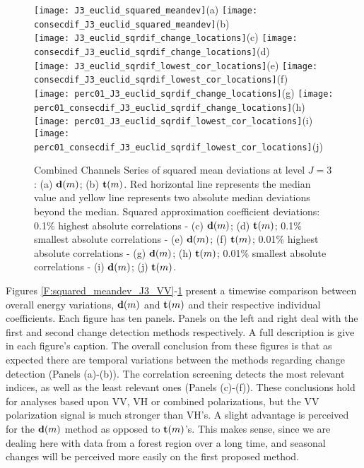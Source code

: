 \documentclass[journal]{IEEEtran}
\newcommand{\vd}{{\textbf d}}
\newcommand{\vt}{{\textbf t}}
\begin{document}
\begin{figure}[htp!]
\texttt{[image: J3\_euclid\_squared\_meandev]}(a)
\texttt{[image: consecdif\_J3\_euclid\_squared\_meandev]}(b)\\
\texttt{[image: J3\_euclid\_sqrdif\_change\_locations]}(c)
\texttt{[image: consecdif\_J3\_euclid\_sqrdif\_change\_locations]}(d)\\
\texttt{[image: J3\_euclid\_sqrdif\_lowest\_cor\_locations]}(e)
\texttt{[image: consecdif\_J3\_euclid\_sqrdif\_lowest\_cor\_locations]}(f)\\
\texttt{[image: perc01\_J3\_euclid\_sqrdif\_change\_locations]}(g)
\texttt{[image: perc01\_consecdif\_J3\_euclid\_sqrdif\_change\_locations]}(h)\\
\texttt{[image: perc01\_J3\_euclid\_sqrdif\_lowest\_cor\_locations]}(i)
\texttt{[image: perc01\_consecdif\_J3\_euclid\_sqrdif\_lowest\_cor\_locations]}(j)
\caption{{\sc Combined Channels} Series of squared mean deviations at level $J=3$: (a) $\vd(m)$; (b) $\vt(m)$. Red horizontal line represents the median value and yellow line represents two absolute median deviations beyond the median. Squared approximation coefficient deviations: 0.1\% highest absolute correlations - (c) $\vd(m)$;  (d) $\vt(m)$; 0.1\% smallest absolute correlations - (e) $\vd(m)$; (f) $\vt(m)$; 0.01\% highest absolute correlations - (g) $\vd(m)$;  (h) $\vt(m)$;  0.01\% smallest absolute correlations - (i) $\vd(m)$; (j)  $\vt(m)$. 
} 
\label{F:squared_meandev_J3_euclid}
\end{figure}

Figures \ref{F:squared_meandev_J3_VV}-\ref{F:squared_meandev_J3_euclid} present a timewise comparison between overall energy variations, $\vd(m)$ and $\vt(m)$ and their respective individual coefficients. Each figure has ten panels. Panels on the left and right deal with the first and second change detection methods respectively. A full description is give in each figure's caption. The overall conclusion from these figures is that as expected there are temporal variations between the methods regarding change detection (Panels (a)-(b)). The correlation screening detects the most relevant indices, as well as the least relevant ones  (Panels (c)-(f)). 
These conclusions hold for analyses based upon VV, VH or combined polarizations, but the VV polarization signal is much stronger than VH's. A slight advantage is perceived for the $\vd(m)$ method as opposed to $\vt(m)$'s. This makes sense, since we are dealing here with data from a forest region over a long time, and seasonal changes will be perceived more easily on the first proposed method.
\end{document}
